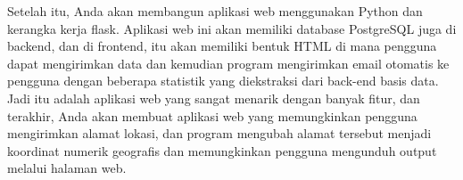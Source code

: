 Setelah itu, Anda akan membangun aplikasi web menggunakan Python dan kerangka kerja flask. Aplikasi web ini akan memiliki database PostgreSQL juga di backend, dan di frontend, itu akan memiliki bentuk HTML di mana pengguna dapat mengirimkan data dan kemudian program mengirimkan email otomatis ke pengguna dengan beberapa statistik yang diekstraksi dari back-end basis data. Jadi itu adalah aplikasi web yang sangat menarik dengan banyak fitur, dan terakhir, Anda akan membuat aplikasi web yang memungkinkan pengguna mengirimkan alamat lokasi, dan program mengubah alamat tersebut menjadi koordinat numerik geografis dan memungkinkan pengguna mengunduh output melalui halaman web.
 